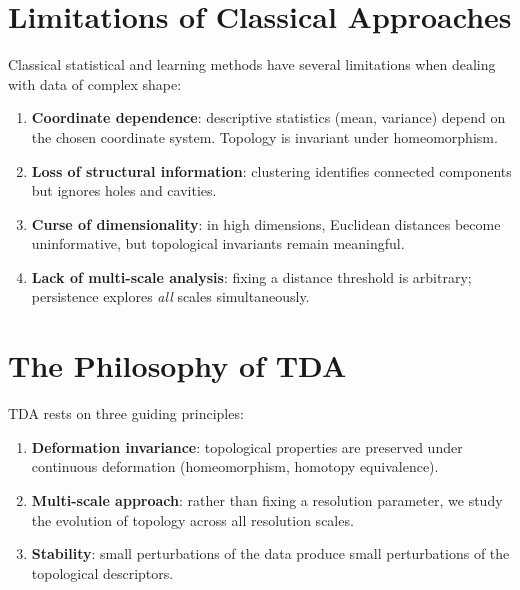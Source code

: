 \section{Limitations of Classical Approaches}

Classical statistical and learning methods have several limitations when
dealing with data of complex shape:

\begin{enumerate}
  \item \textbf{Coordinate dependence}: descriptive statistics (mean,
        variance) depend on the chosen coordinate system. Topology is
        invariant under homeomorphism.
  \item \textbf{Loss of structural information}: clustering identifies
        connected components but ignores holes and cavities.
  \item \textbf{Curse of dimensionality}: in high dimensions, Euclidean
        distances become uninformative, but topological invariants remain
        meaningful.
  \item \textbf{Lack of multi-scale analysis}: fixing a distance
        threshold is arbitrary; persistence explores \emph{all} scales
        simultaneously.
\end{enumerate}

\section{The Philosophy of TDA}

TDA rests on three guiding principles:

\begin{definition}
\begin{enumerate}
  \item \textbf{Deformation invariance}: topological properties are
        preserved under continuous deformation (homeomorphism, homotopy
        equivalence).
  \item \textbf{Multi-scale approach}: rather than fixing a resolution
        parameter, we study the evolution of topology across all
        resolution scales.
  \item \textbf{Stability}: small perturbations of the data produce
        small perturbations of the topological descriptors.
\end{enumerate}
\end{definition}

